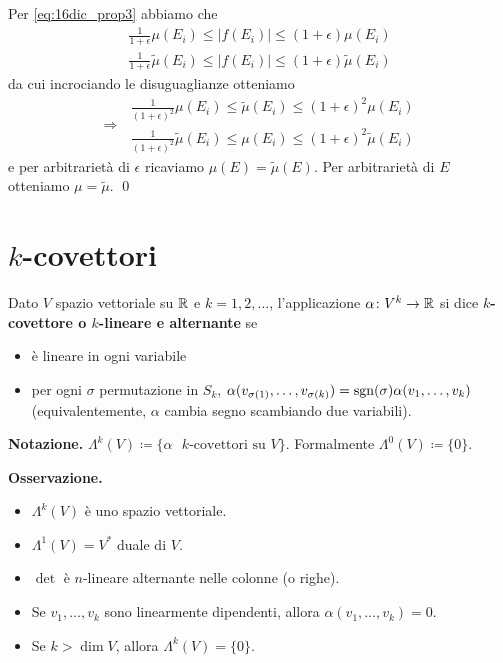 Per \eqref{eq:16dic_prop3} abbiamo che
%
\begin{gather*}
	\frac{1}{1+\epsilon} \mu(E_i) \leq |f(E_i)| \leq (1+\epsilon) \mu(E_i) \\
	\frac{1}{1+\epsilon} \tilde{\mu}(E_i) \leq |f(E_i)| \leq (1+\epsilon) \tilde{\mu}(E_i)
\end{gather*}
da cui incrociando le disuguaglianze otteniamo
$$
\Longrightarrow \;
\begin{gathered}
	\frac{1}{(1+\epsilon)^2} \mu(E_i) \leq \tilde \mu(E_i) \leq (1+\epsilon)^2 \mu(E_i) \\
	\frac{1}{(1+\epsilon)^2} \tilde \mu(E_i) \leq \mu(E_i) \leq (1+\epsilon)^2 \tilde \mu(E_i)
\end{gathered}
$$
e per arbitrarietà di $\epsilon$ ricaviamo $\mu(E) = \tilde{\mu}(E)$. Per arbitrarietà di $E$ otteniamo $\mu = \tilde{\mu}$.
\qed


\section{$k$-covettori}

Dato $V$ spazio vettoriale su $\mathbb R$ e $k=1,2,\ldots$, l'applicazione $\alpha \colon  V^k \to \mathbb R$ si dice \textbf{$k$-covettore o $k$-lineare e alternante} se
\begin{itemize}

	\item è lineare in ogni variabile

	\item per ogni $\sigma$ permutazione in $S_k$, $\alpha(v_{\sigma(1)},\ldots,v_{\sigma(k)}) = \operatorname{sgn}(\sigma) \alpha(v_1,\ldots,v_k)$ (equivalentemente, $\alpha$ cambia segno scambiando due variabili).

\end{itemize}

\textbf{Notazione.} $\Lambda^k (V) \coloneqq  \{\alpha \text{ $k$-covettori su } V \}$. Formalmente $\Lambda^0(V) \coloneqq \{0\}$.

\textbf{Osservazione.} 
\begin{itemize}

	\item $\Lambda^k(V)$ è uno spazio vettoriale. 

	\item $\Lambda^1(V) = V^*$ duale di $V$.

	\item $\det$ è $n$-lineare alternante nelle colonne (o righe).

	\item Se $v_1,\ldots,v_k$ sono linearmente dipendenti, allora $\alpha(v_1,\ldots,v_k) = 0$.

	\item Se $k > \dim V$, allora $\Lambda^k(V) = \{0\}$.

\end{itemize}


